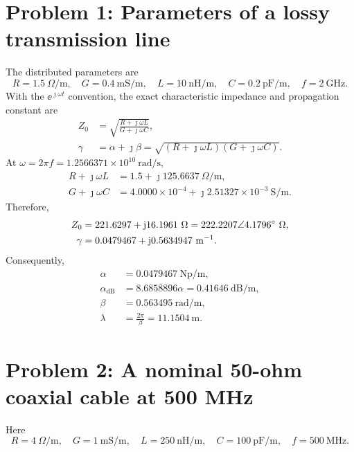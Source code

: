 \documentclass[12pt,a4paper]{article}
\begin{document}
\MakeTitlePage
\tableofcontents
\newpage

\section{Problem 1: Parameters of a lossy transmission line}

\LineElementDiagram

The distributed parameters are
\[
R=1.5~\Omega/\mathrm{m},\quad G=0.4~\mathrm{mS/m},\quad
L=10~\mathrm{nH/m},\quad C=0.2~\mathrm{pF/m},\quad f=2~\mathrm{GHz}.
\]
With the $\ee^{\jmath\omega t}$ convention, the exact characteristic impedance and
propagation constant are
\begin{align}
Z_0&=\sqrt{\frac{R+\jmath\omega L}{G+\jmath\omega C}},\\
\gamma&=\alpha+\jmath\beta
=\sqrt{(R+\jmath\omega L)(G+\jmath\omega C)}.
\end{align}
At $\omega=2\pi f=1.2566371\times10^{10}~\mathrm{rad/s}$,
\begin{align*}
R+\jmath\omega L&=1.5+\jmath125.6637~\Omega/\mathrm{m},\\
G+\jmath\omega C&=4.0000\times10^{-4}
 +\jmath2.51327\times10^{-3}~\mathrm{S/m}.
\end{align*}
Therefore,
\begin{align}
Z_0&=221.6297+\mathrm{j}16.1961~\Omega
     =222.2207\angle4.1796^{\circ}~\Omega,\\
\gamma&=0.0479467+\mathrm{j}0.5634947~\mathrm{m}^{-1}.
\end{align}
Consequently,
\begin{align*}
\alpha&=0.0479467~\mathrm{Np/m},\\
\alpha_{\mathrm{dB}}&=8.6858896\alpha=0.41646~\mathrm{dB/m},\\
\beta&=0.563495~\mathrm{rad/m},\\
\lambda&=\frac{2\pi}{\beta}=11.1504~\mathrm{m}.
\end{align*}


\section{Problem 2: A nominal 50-ohm coaxial cable at 500 MHz}

Here
\[
R=4~\Omega/\mathrm{m},\quad G=1~\mathrm{mS/m},\quad
L=250~\mathrm{nH/m},\quad C=100~\mathrm{pF/m},\quad f=500~\mathrm{MHz}.
\]
\end{document}
